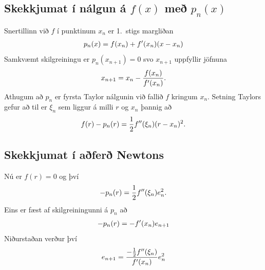 \documentclass[letterpaper,10pt,icelandic]{sphinxmanual}
\begin{document}
\subsection{Skekkjumat í nálgun á \(f(x)\) með \(p_n(x)\)}
\label{kafli02:id6}
Snertillinn við \(f\) í punktinum \(x_n\) er 1. stigs margliðan
\begin{gather}
\begin{split}p_n(x) = f(x_n) + f'(x_n)(x-x_n)\end{split}\notag
\end{gather}
Samkvæmt skilgreiningu er \(p_n(x_{n+1}) = 0\) svo \(x_{n+1}\)
uppfyllir jöfnuna
\begin{gather}
\begin{split}x_{n+1} = x_n - \frac{f(x_n)}{f'(x_n)}.\end{split}\notag
\end{gather}
Athugum að \(p_n\) er fyrsta Taylor nálgunin við fallið \(f\)
kringum \(x_n\). Setning Taylors gefur að til er \(\xi_n\) sem
liggur á milli \(r\) og \(x_n\) þannig að
\begin{gather}
\begin{split}f(r) - p_n(r) = \frac{1}{2}f''(\xi_n)(r-x_n)^2.\end{split}\notag
\end{gather}

\subsection{Skekkjumat í aðferð Newtons}
\label{kafli02:skekkjumat-i-afer-newtons}
Nú er \(f(r) = 0\) og því
\begin{gather}
\begin{split}-p_n(r) = \frac{1}{2}f''(\xi_n)e_n^2.\end{split}\notag
\end{gather}
Eins er fæst af skilgreiningunni á \(p_n\) að
\begin{gather}
\begin{split}-p_n(r) = -f'(x_n)e_{n+1}\end{split}\notag
\end{gather}
Niðurstaðan verður því
\begin{gather}
\begin{split}e_{n+1} = \frac{-\frac{1}{2}f''(\xi_n)}
        {f'(x_n)}e_n^2\end{split}\notag
\end{gather}
\end{document}

